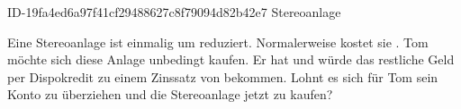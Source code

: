 \begin{exercise}
      {ID-19fa4ed6a97f41cf29488627c8f79094d82b42e7}
      {Stereoanlage}
  \ifproblem\problem\par
    Eine Stereoanlage ist einmalig um  reduziert. Normalerweise kostet
    sie . Tom möchte sich diese Anlage unbedingt kaufen. Er hat
     und würde das restliche Geld per Dispokredit zu einem Zinssatz
    von  bekommen. Lohnt es sich für Tom sein Konto zu überziehen und
    die Stereoanlage jetzt zu kaufen?
  \fi
\end{exercise}
